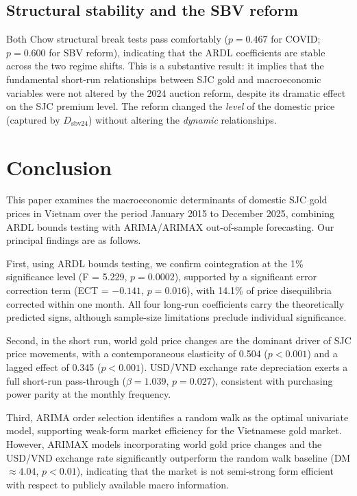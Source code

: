 \documentclass[12pt,a4paper]{article}
\begin{document}
\subsection{Structural stability and the SBV reform}

Both Chow structural break tests pass comfortably ($p = 0.467$ for COVID;
$p = 0.600$ for SBV reform), indicating that the ARDL coefficients are
stable across the two regime shifts. This is a substantive result: it
implies that the fundamental short-run relationships between SJC gold
and macroeconomic variables were not altered by the 2024 auction reform,
despite its dramatic effect on the SJC premium level. The reform changed
the \textit{level} of the domestic price (captured by $D_{\text{sbv24}}$)
without altering the \textit{dynamic} relationships.

\section{Conclusion}
\label{sec:conclusion}

This paper examines the macroeconomic determinants of domestic SJC gold
prices in Vietnam over the period January 2015 to December 2025, combining
ARDL bounds testing with ARIMA/ARIMAX out-of-sample forecasting. Our principal
findings are as follows.

First, using ARDL bounds testing, we confirm cointegration at the 1\%
significance level (F = 5.229, $p = 0.0002$), supported by a significant
error correction term (ECT = $-0.141$, $p = 0.016$), with 14.1\% of
price disequilibria corrected within one month.
All four long-run coefficients carry the theoretically predicted signs,
although sample-size limitations preclude individual significance.

Second, in the short run, world gold price changes are the dominant driver
of SJC price movements, with a contemporaneous elasticity of 0.504 ($p < 0.001$)
and a lagged effect of 0.345 ($p < 0.001$). USD/VND exchange rate depreciation
exerts a full short-run pass-through ($\beta = 1.039$, $p = 0.027$),
consistent with purchasing power parity at the monthly frequency.

Third, ARIMA order selection identifies a random walk as the optimal
univariate model, supporting weak-form market efficiency for the Vietnamese
gold market. However, ARIMAX models incorporating world gold price changes
and the USD/VND exchange rate significantly outperform the random walk
baseline (DM $\approx 4.04$, $p < 0.01$), indicating that the market is
not semi-strong form efficient with respect to publicly available macro
information.
\end{document}
